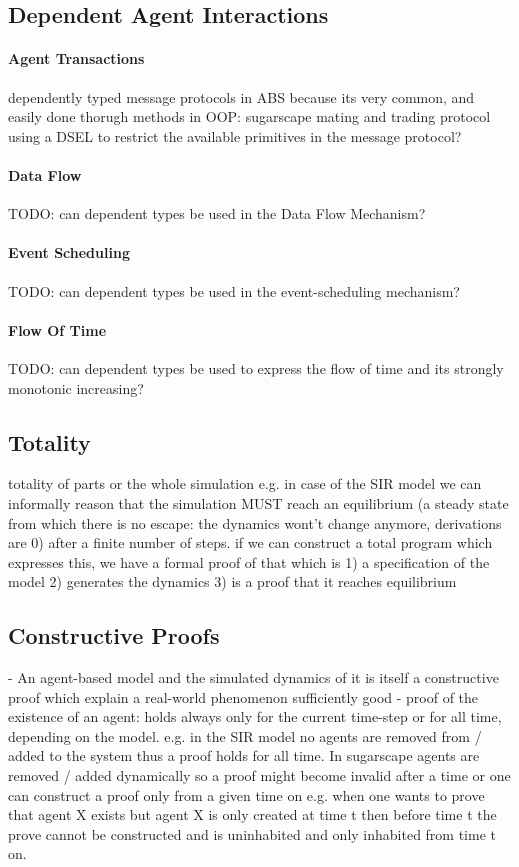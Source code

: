 \subsection{Dependent Agent Interactions}
\paragraph{Agent Transactions}
dependently typed message protocols in ABS because its very common, and easily done thorugh methods in OOP: sugarscape mating and trading protocol
using a DSEL \cite{brady_correct-by-construction_2010} to restrict the available primitives in the message protocol?

\paragraph{Data Flow}
TODO: can dependent types be used in the Data Flow Mechanism?
\paragraph{Event Scheduling}
TODO: can dependent types be used in the event-scheduling mechanism?

\paragraph{Flow Of Time}
TODO: can dependent types be used to express the flow of time and its strongly monotonic increasing?

\subsection{Totality}
totality of parts or the whole simulation e.g. in case of the SIR model we can informally reason that the simulation MUST reach an equilibrium (a steady state from which there is no escape: the dynamics wont't change anymore, derivations are 0) after a finite number of steps. if we can construct a total program which expresses this, we have a formal proof of that which is 1) a specification of the model 2) generates the dynamics 3) is a proof that it reaches equilibrium

\subsection{Constructive Proofs}
- An agent-based model and the simulated dynamics of it is itself a constructive proof which explain a real-world phenomenon sufficiently good
- proof of the existence of an agent: holds always only for the current time-step or for all time, depending on the model. e.g. in the SIR model no agents are removed from / added to the system thus a proof holds for all time. In sugarscape agents are removed / added dynamically so a proof might become invalid after a time or one can construct a proof only from a given time on e.g. when one wants to prove that agent X exists but agent X is only created at time t then before time t the prove cannot be constructed and is uninhabited and only inhabited from time t on.

